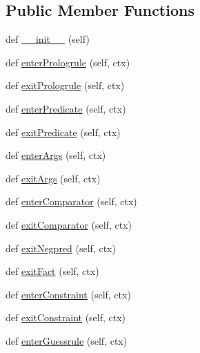 \subsection*{Public Member Functions}
\begin{DoxyCompactItemize}
\item 
def \hyperlink{classparse__asp__rules_1_1_rule_listener_aed6c20fc3c3d74f0c1376613a7ccd20f}{\+\_\+\+\_\+init\+\_\+\+\_\+} (self)
\item 
def \hyperlink{classparse__asp__rules_1_1_rule_listener_a2b9cbc635f40644c6b28baba9e9bc4e9}{enter\+Prologrule} (self, ctx)
\item 
def \hyperlink{classparse__asp__rules_1_1_rule_listener_a08f581c9ffe13176b525255e52c796d0}{exit\+Prologrule} (self, ctx)
\item 
def \hyperlink{classparse__asp__rules_1_1_rule_listener_a820be3f56f380c25b5ff0aeb22e86d26}{enter\+Predicate} (self, ctx)
\item 
def \hyperlink{classparse__asp__rules_1_1_rule_listener_af426f2bb479d05bcd8e92450f2ad0727}{exit\+Predicate} (self, ctx)
\item 
def \hyperlink{classparse__asp__rules_1_1_rule_listener_a79a793d00444872649dc32fb1e818f6d}{enter\+Args} (self, ctx)
\item 
def \hyperlink{classparse__asp__rules_1_1_rule_listener_a6722386aedbdd509047d8c12645c3573}{exit\+Args} (self, ctx)
\item 
def \hyperlink{classparse__asp__rules_1_1_rule_listener_ae19f0844f103ed4a8257353f6f82aec6}{enter\+Comparator} (self, ctx)
\item 
def \hyperlink{classparse__asp__rules_1_1_rule_listener_a2f6e4d416fb7e003559f67a897b7eef9}{exit\+Comparator} (self, ctx)
\item 
def \hyperlink{classparse__asp__rules_1_1_rule_listener_a70653f14a5807e7dfca391537cb58292}{exit\+Negpred} (self, ctx)
\item 
def \hyperlink{classparse__asp__rules_1_1_rule_listener_ae87dd1e8ab64069f895a475960671e56}{exit\+Fact} (self, ctx)
\item 
def \hyperlink{classparse__asp__rules_1_1_rule_listener_a51f78e68592774bb99a9a7438316a57c}{enter\+Constraint} (self, ctx)
\item 
def \hyperlink{classparse__asp__rules_1_1_rule_listener_a8d46ae0d296f1fb63a3497a2133ad622}{exit\+Constraint} (self, ctx)
\item 
def \hyperlink{classparse__asp__rules_1_1_rule_listener_a486d9501f9d43b4ec18087927a4bc0eb}{enter\+Guessrule} (self, ctx)

\end{DoxyCompactItemize}
